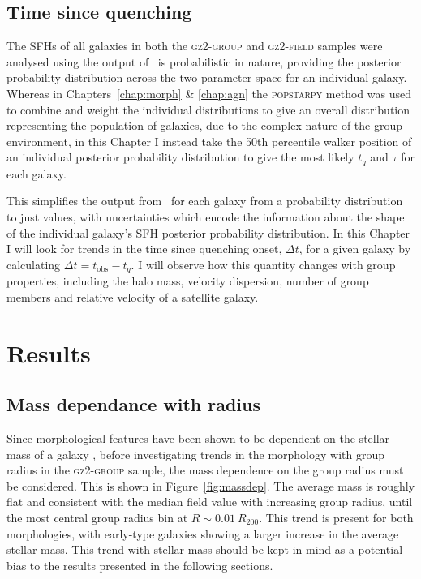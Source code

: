 \subsection{Time since quenching}\label{sec:delta}

The SFHs of all galaxies in both the \textsc{gz2-group} and \textsc{gz2-field} samples were analysed using \starpy\; the output of \starpy\ is probabilistic in nature, providing the posterior probability distribution across the two-parameter space for an individual galaxy. Whereas in Chapters~\ref{chap:morph} \& \ref{chap:agn} the \textsc{popstarpy} method was used to combine and weight the individual distributions to give an overall distribution representing the population of galaxies, due to the complex nature of the group environment, in this Chapter I instead take the 50th percentile walker position of an individual posterior probability distribution to give the most likely $t_{q}$ and $\tau$ for each galaxy. \

This simplifies the output from \starpy  ~for each galaxy from a probability distribution to just values, with uncertainties which encode the information about the shape of the individual galaxy's SFH posterior probability distribution. In this Chapter I will look for trends in the time since quenching onset, $\Delta t$, for a given galaxy by calculating {\bf $\Delta t = t_\mathrm{obs} - t_{q}$}. I will observe how this quantity changes with group properties, including the halo mass, velocity dispersion, number of group members and relative velocity of a satellite galaxy. 


\section{Results}\label{sec:results}

\subsection{Mass dependance with radius}

Since morphological features have been shown to be dependent on the stellar mass of a galaxy \citep[e.g. the increase in the bar fraction with stellar mass; see][]{nair10, skibba12}, before investigating trends in the morphology with group radius in the \textsc{gz2-group} sample, the mass dependence on the group radius must be considered. This is shown in Figure~\ref{fig:massdep}. The average mass is roughly flat and consistent with the median field value with increasing group radius, until the most central group radius bin at $R \sim 0.01~R_{200}$. This trend is present for both morphologies, with early-type galaxies showing a larger increase in the average stellar mass. This trend with stellar mass should be kept in mind as a potential bias to the results presented in the following sections. 

